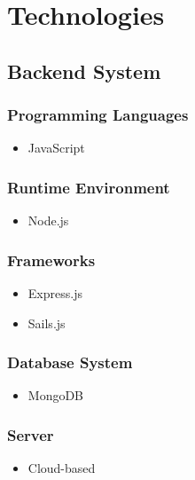 \documentclass[11pt,fleqn]{book} %
\begin{document}
	
	
	
	\chapter{Technologies}
	
	\section{Backend System}
	\subsection{Programming Languages}
	\begin{itemize}
		\item JavaScript
	\end{itemize}
	\subsection{Runtime Environment}
	\begin{itemize}
		\item Node.js
	\end{itemize}
	\subsection{Frameworks}
	\begin{itemize}
		\item Express.js
		\item Sails.js
	\end{itemize}
	\subsection{Database System}
	\begin{itemize}
		\item MongoDB
	\end{itemize}
	\subsection{Server}
	\begin{itemize}
		\item Cloud-based
	\end{itemize}
\end{document}
